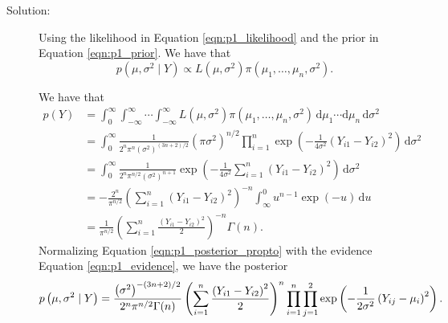 \documentclass[letterpaper,11pt]{article}
\begin{document}
\begin{enumerate}
\begin{enumerate}
      \begin{description}
      \item[Solution:] Using the likelihood in Equation \ref{eqn:p1_likelihood}
        and the prior in Equation \ref{eqn:p1_prior}. We have that
        \begin{equation}
          p\left(\mu, \sigma^2 \mid Y\right) \propto L\left(\mu, \sigma^2\right)\pi\left(
            \mu_1,\ldots,\mu_n,\sigma^2
          \right).
          \label{eqn:p1_posterior_propto}
        \end{equation}

        We have that
        \begin{align}
          p\left(Y\right)
          &= \int_{0}^\infty\int_{-\infty}^{\infty}\cdots\int_{-\infty}^{\infty}
          L\left(\mu, \sigma^2\right)\pi\left(\mu_1,\ldots,\mu_n,\sigma^2\right)\,\mathrm{d}\mu_1\cdots
            \mathrm{d}\mu_n\,\mathrm{d}\sigma^2 \nonumber\\
          &= \int_{0}^\infty \frac{1}{2^n\pi^n\left(\sigma^2\right)^{(3n + 2)/2}} \left(\pi\sigma^2\right)^{n/2}
            \prod_{i=1}^n \exp\left(-\frac{1}{4\sigma^2}\left(Y_{i1} - Y_{i2}\right)^2\right)
            \,\mathrm{d}\sigma^2 \nonumber\\
          &= \int_{0}^\infty \frac{1}{2^n\pi^{n/2}\left(\sigma^2\right)^{n + 1}}
            \exp\left(-\frac{1}{4\sigma^2}\sum_{i=1}^n \left(Y_{i1} - Y_{i2}\right)^2\right)
            \,\mathrm{d}\sigma^2 \nonumber\\
          &= -\frac{2^n}{\pi^{n/2}}\left(\sum_{i=1}^n \left(Y_{i1} - Y_{i2}\right)^2\right)^{-n}
            \int_\infty^0u^{n-1}\exp\left(-u\right)\,\mathrm{d}u \nonumber\\
          &= \frac{1}{\pi^{n/2}}\left(\sum_{i=1}^n \frac{\left(Y_{i1} - Y_{i2}\right)^2}{2}\right)^{-n}\Gamma(n).
            \label{eqn:p1_evidence}
        \end{align}
        Normalizing Equation \ref{eqn:p1_posterior_propto} with the evidence
        Equation \ref{eqn:p1_evidence}, we have the posterior
        \begin{equation}
          \tiny
          p\left(\mu, \sigma^2 \mid Y\right)
          =
          \frac{\left(\sigma^2\right)^{-(3n+2)/2}}{2^n\pi^{n/2}\Gamma(n)}
          \left(\sum_{i=1}^n \frac{\left(Y_{i1} - Y_{i2}\right)^2}{2}\right)^{n}
          \prod_{i=1}^n \prod_{j=1}^2 \exp\left(
            -\frac{1}{2\sigma^2}\left(Y_{ij} - \mu_i\right)^2
          \right).
          \label{eqn:p1_posterior}
        \end{equation}


\end{description}
\end{enumerate}
\end{enumerate}
\end{document}

